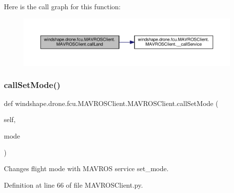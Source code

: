 Here is the call graph for this function\+:\nopagebreak
\begin{figure}[H]
\begin{center}
\leavevmode
\includegraphics[width=350pt]{classwindshape_1_1drone_1_1fcu_1_1_m_a_v_r_o_s_client_1_1_m_a_v_r_o_s_client_ac77f4239dbb70c88ed3bf45967b35fc0_cgraph}
\end{center}
\end{figure}
\mbox{\label{classwindshape_1_1drone_1_1fcu_1_1_m_a_v_r_o_s_client_1_1_m_a_v_r_o_s_client_a45ddb81a76860f822dbfc21e2bacd82f}} 
\subsubsection{\texorpdfstring{call\+Set\+Mode()}{callSetMode()}}
{\footnotesize\ttfamily def windshape.\+drone.\+fcu.\+M\+A\+V\+R\+O\+S\+Client.\+M\+A\+V\+R\+O\+S\+Client.\+call\+Set\+Mode (\begin{DoxyParamCaption}\item[{}]{self,  }\item[{}]{mode }\end{DoxyParamCaption})}

\begin{DoxyVerb}Changes flight mode with MAVROS service set_mode.\end{DoxyVerb}
 

Definition at line 66 of file M\+A\+V\+R\+O\+S\+Client.\+py.

